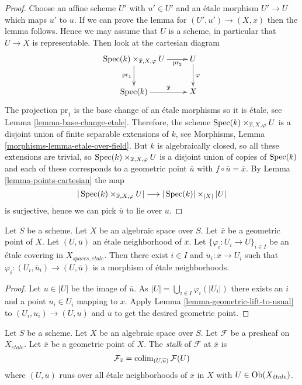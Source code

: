 \begin{proof}
Choose an affine scheme $U'$ with $u' \in U'$ and an \'etale morphism
$U' \to U$ which maps $u'$ to $u$. If we can prove the lemma for
$(U', u') \to (X, x)$ then the lemma follows. Hence we may assume that
$U$ is a scheme, in particular that $U \to X$ is representable.
Then look at the cartesian diagram
$$
\xymatrix{
\Spec(k) \times_{\overline{x}, X, \varphi} U
\ar[d]_{\text{pr}_1} \ar[r]_-{\text{pr}_2} & U
\ar[d]^\varphi \\
\Spec(k) \ar[r]^-{\overline{x}} & X
}
$$
The projection $\text{pr}_1$ is the base change of an \'etale morphisms
so it is \'etale, see
Lemma \ref{lemma-base-change-etale}.
Therefore, the scheme $\mathop{\rm Spec}(k) \times_{\overline{x}, X, \varphi} U$
is a disjoint union of finite separable extensions of $k$, see
Morphisms, Lemma \ref{morphisms-lemma-etale-over-field}.
But $k$ is algebraically closed, so all these extensions are trivial,
so $\mathop{\rm Spec}(k) \times_{\overline{x}, X, \varphi} U$
is a disjoint union of copies of $\mathop{\rm Spec}(k)$ and each of
these corresponds to a geometric point $\overline{u}$ with
$f \circ \overline{u} = \overline{x}$. By
Lemma \ref{lemma-points-cartesian}
the map
$$
|\mathop{\rm Spec}(k) \times_{\overline{x}, X, \varphi} U|
\longrightarrow
|\mathop{\rm Spec}(k)| \times_{|X|} |U|
$$
is surjective, hence we can pick $\overline{u}$ to lie over $u$.
\end{proof}

\begin{lemma}
\label{lemma-geometric-lift-to-cover}
Let $S$ be a scheme. Let $X$ be an algebraic space over $S$.
Let $\overline{x}$ be a geometric point of $X$.
Let $(U, \overline{u})$ an \'etale neighborhood of $\overline{x}$.
Let $\{\varphi_i : U_i \to U\}_{i \in I}$ be an \'etale covering in
$X_{spaces, \acute{e}tale}$.
Then there exist $i \in I$ and $\overline{u}_i : \overline{x} \to U_i$
such that $\varphi_i : (U_i, \overline{u}_i) \to (U, \overline{u})$
is a morphism of \'etale neighborhoods.
\end{lemma}

\begin{proof}
Let $u \in |U|$ be the image of $\overline{u}$.
As $|U| = \bigcup_{i \in I} \varphi_i(|U_i|)$ there exists an
$i$ and a point $u_i \in U_i$ mapping to $x$. Apply
Lemma \ref{lemma-geometric-lift-to-usual}
to $(U_i, u_i) \to (U, u)$ and $\overline{u}$ to
get the desired geometric point.
\end{proof}

\begin{definition}
\label{definition-stalk}
Let $S$ be a scheme. Let $X$ be an algebraic space over $S$.
Let $\mathcal{F}$ be a presheaf on $X_{\acute{e}tale}$.
Let $\overline{x}$ be a geometric point of $X$.
The {\it stalk} of $\mathcal{F}$ at $\overline{x}$ is
$$
\mathcal{F}_{\bar x}
=
\mathop{\rm colim}\nolimits_{(U, \overline{u})} \mathcal{F}(U)
$$
where $(U, \overline{u})$ runs over all \'etale neighborhoods
of $\overline{x}$ in $X$ with $U \in \mathop{\rm Ob}\nolimits(X_{\acute{e}tale})$.
\end{definition}

